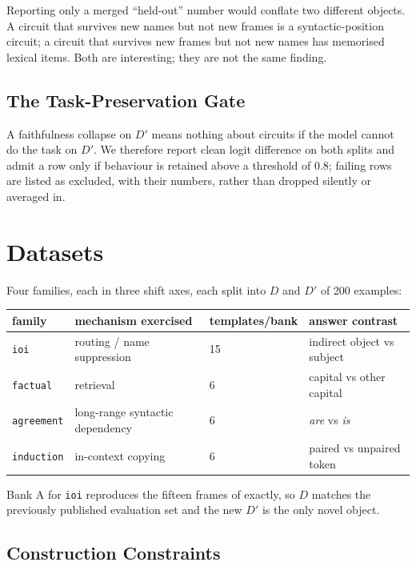 \documentclass[11pt,a4paper]{article}
\begin{document}
Reporting only a merged ``held-out'' number would conflate two different objects. A
circuit that survives new names but not new frames is a syntactic-position circuit; a
circuit that survives new frames but not new names has memorised lexical items. Both
are interesting; they are not the same finding.

\subsection{The Task-Preservation Gate}
\label{sec:gate}

A faithfulness collapse on $D'$ means nothing about circuits if the model cannot do
the task on $D'$. We therefore report clean logit difference on both splits and admit
a row only if behaviour is retained above a threshold of $0.8$; failing rows are
listed as excluded, with their numbers, rather than dropped silently or averaged in.

\section{Datasets}
\label{sec:datasets}

Four families, each in three shift axes, each split into $D$ and $D'$ of 200 examples:

\begin{center}
\begin{tabular}{llll}
\toprule
family & mechanism exercised & templates/bank & answer contrast \\
\midrule
\texttt{ioi}       & routing / name suppression      & 15 & indirect object vs subject \\
\texttt{factual}   & retrieval                       & 6  & capital vs other capital \\
\texttt{agreement} & long-range syntactic dependency & 6  & \emph{are} vs \emph{is} \\
\texttt{induction} & in-context copying              & 6  & paired vs unpaired token \\
\bottomrule
\end{tabular}
\end{center}

Bank A for \texttt{ioi} reproduces the fifteen frames of \citet{melton2026circuits}
exactly, so $D$ matches the previously published evaluation set and the new $D'$ is
the only novel object.

\subsection{Construction Constraints}
\end{document}
